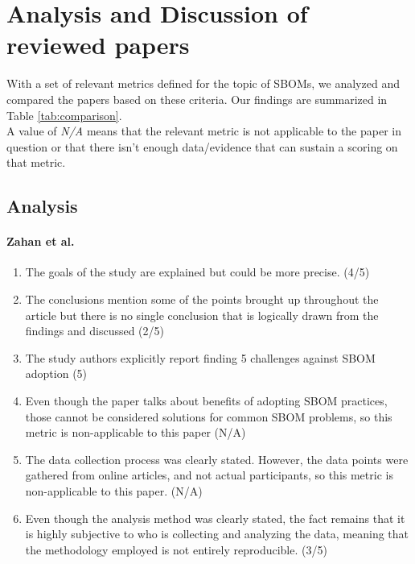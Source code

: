\section{Analysis and Discussion of reviewed papers} \label{analysis}

\noindent With a set of relevant metrics defined for the topic of SBOMs, we analyzed and compared the papers based on these criteria. Our findings are summarized in Table \ref{tab:comparison}. 
\\A value of \emph{N/A} means that the relevant metric is not applicable to the paper in question or that there isn't enough data/evidence that can sustain a scoring on that metric.

\subsection{Analysis} \label{analysis}

\paragraph{Zahan et al. \cite{article:sbom-required}}

\begin{enumerate}
    \item The goals of the study are explained but could be more precise. (4/5)
    \item The conclusions mention some of the points brought up throughout the article but there is no single conclusion that is logically drawn from the findings and discussed (2/5)
    \item The study authors explicitly report finding 5 challenges against SBOM adoption (5)
    \item Even though the paper talks about benefits of adopting SBOM practices, those cannot be considered solutions for common SBOM problems, so this metric is non-applicable to this paper (N/A)
    \item The data collection process was clearly stated. However, the data points were gathered from online articles, and not actual participants, so this metric is non-applicable to this paper. (N/A)
    \item Even though the analysis method was clearly stated, the fact remains that it is highly subjective to who is collecting and analyzing the data, meaning that the methodology employed is not entirely reproducible. (3/5)
\end{enumerate}

